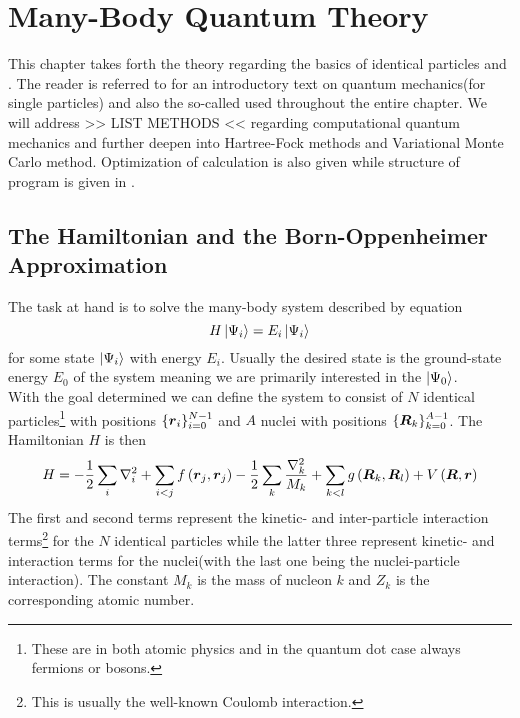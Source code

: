 \chapter{Many-Body Quantum Theory\label{chapter:3}}     
    This chapter takes forth the theory regarding the basics of identical
    particles and . The reader is referred
    to \cite{GriffQuan} for an introductory text on quantum mechanics(for
    single particles) and also the so-called  used
    throughout the entire chapter. We will address >> LIST METHODS << regarding
    computational quantum mechanics and further deepen into Hartree-Fock
    methods and Variational Monte Carlo method. Optimization of calculation is
    also given while structure of program is given in .

\section{The Hamiltonian and the Born-Oppenheimer Approximation\label{sec:3.1}}
    The task at hand is to solve the many-body system described by
     equation
        \begin{equation}
            H\ket{\Psi_i} = E_i\ket{\Psi_i}
            \label{eq:SE}
        \end{equation}
    for some state $\ket{\Psi_i}$ with energy $E_i$. Usually the desired state
    is the ground-state energy $E_0$ of the system meaning we are primarily
    interested in the  $\ket{\Psi_0}$. \\ With the goal
    determined we can define the system to consist of $N$ identical
    particles\footnote{These are in both atomic physics and in the quantum dot
    case always fermions or bosons.} with positions
    $\{\boldsymbol{{r}}_i\}^{N-1}_{i=0}$ and $A$ nuclei with positions
    $\{\boldsymbol{{R}}_k\}^{A-1}_{k=0}$. The Hamiltonian $H$ is then
        \begin{equation}
            H = - \frac{1}{2} \sum\limits_i \nabla^2_i + \sum_{i<j}
            f\left(\boldsymbol{{r}}_j, \boldsymbol{{r}}_j\right) - \frac{1}{2} \sum_k
            \frac{\nabla^2_k}{M_k} + \sum_{k<l}
            g\left(\boldsymbol{{R}}_k,\boldsymbol{{R}}_l\right) +
            V\left(\boldsymbol{{R}},\boldsymbol{{r}}\right)
        \end{equation}
    The first and second terms represent the kinetic- and inter-particle
    interaction terms\footnote{This is usually the well-known Coulomb
    interaction.} for the $N$ identical particles while the latter three
    represent kinetic- and interaction terms for the nuclei(with the last one
    being the nuclei-particle interaction). The constant $M_k$ is the mass of
    nucleon $k$ and $Z_k$ is the corresponding atomic number.

